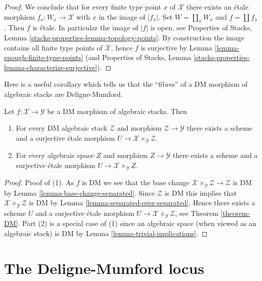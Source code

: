 \begin{proof}
\medskip\noindent
We conclude that for every finite type point $x$ of $\mathcal{X}$ there
exists an \'etale morphism $f_x : W_x \to \mathcal{X}$ with $x$ in the
image of $|f_x|$. Set $W = \coprod_x W_x$ and $f = \coprod f_x$. Then $f$
is \'etale. In particular the image of $|f|$ is open, see
Properties of Stacks, Lemma \ref{stacks-properties-lemma-topology-points}.
By construction the image contains all finite type points of $\mathcal{X}$,
hence $f$ is surjective by
Lemma \ref{lemma-enough-finite-type-points} (and
Properties of Stacks, Lemma
\ref{stacks-properties-lemma-characterize-surjective}).
\end{proof}

\noindent
Here is a useful corollary which tells us that the ``fibres'' of
a DM morphism of algebraic stacks are Deligne-Mumford.

\begin{lemma}
\label{lemma-DM}
Let $f : \mathcal{X} \to \mathcal{Y}$ be a DM morphism of algebraic
stacks. Then
\begin{enumerate}
\item For every DM algebraic stack $\mathcal{Z}$ and morphism
$\mathcal{Z} \to \mathcal{Y}$ there exists a scheme and
a surjective \'etale morphism
$U \to \mathcal{X} \times_\mathcal{Y} \mathcal{Z}$.
\item For every algebraic space $Z$ and morphism
$Z \to \mathcal{Y}$ there exists a scheme and
a surjective \'etale morphism
$U \to \mathcal{X} \times_\mathcal{Y} Z$.
\end{enumerate}
\end{lemma}

\begin{proof}
Proof of (1). As $f$ is DM we see that the base change
$\mathcal{X} \times_\mathcal{Y} \mathcal{Z} \to \mathcal{Z}$ is DM
by Lemma \ref{lemma-base-change-separated}.
Since $\mathcal{Z}$ is DM this implies that
$\mathcal{X} \times_\mathcal{Y} \mathcal{Z}$ is DM
by Lemma \ref{lemma-separated-over-separated}. Hence there exists a
scheme $U$ and a surjective \'etale morphism
$U \to \mathcal{X} \times_\mathcal{Y} \mathcal{Z}$, see
Theorem \ref{theorem-DM}.
Part (2) is a special case of (1) since an algebraic space
(when viewed as an algebraic stack) is DM by
Lemma \ref{lemma-trivial-implications}.
\end{proof}






\section{The Deligne-Mumford locus}
\label{section-DM}

